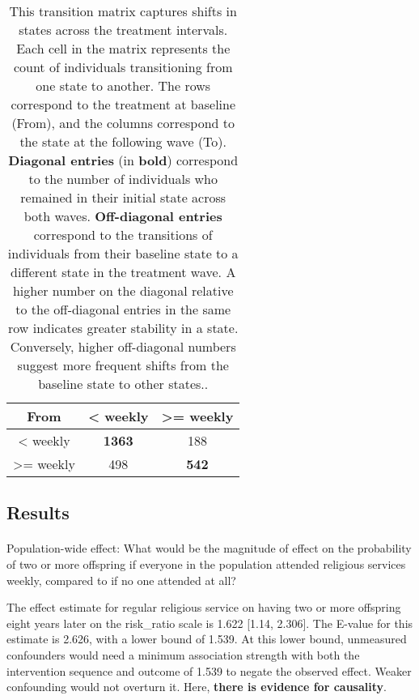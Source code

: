 \documentclass[
  single column]{article}
\makeatletter
\let\oldparagraph\paragraph
\renewcommand{\paragraph}{
    \@ifstar
      \xxxParagraphStar
      \xxxParagraphNoStar
  }
\newcommand{\xxxParagraphStar}[1]{\oldparagraph*{#1}\mbox{}}
\newcommand{\xxxParagraphNoStar}[1]{\oldparagraph{#1}\mbox{}}
\makeatother
\begin{document}
\begin{longtable}[]{@{}ccc@{}}

\caption{\label{tbl-transition}This transition matrix captures shifts in
states across the treatment intervals. Each cell in the matrix
represents the count of individuals transitioning from one state to
another. The rows correspond to the treatment at baseline (From), and
the columns correspond to the state at the following wave (To).
\textbf{Diagonal entries} (in \textbf{bold}) correspond to the number of
individuals who remained in their initial state across both waves.
\textbf{Off-diagonal entries} correspond to the transitions of
individuals from their baseline state to a different state in the
treatment wave. A higher number on the diagonal relative to the
off-diagonal entries in the same row indicates greater stability in a
state. Conversely, higher off-diagonal numbers suggest more frequent
shifts from the baseline state to other states..}

\tabularnewline

\toprule\noalign{}
From & \textless{} weekly & \textgreater= weekly \\
\midrule\noalign{}
\endhead
\bottomrule\noalign{}
\endlastfoot
\textless{} weekly & \textbf{1363} & 188 \\
\textgreater= weekly & 498 & \textbf{542} \\

\end{longtable}

\newpage{}

\subsection{Results}\label{results}

\paragraph{Population-wide effect: What would be the magnitude of effect
on the probability of two or more offspring if everyone in the
population attended religious services weekly, compared to if no one
attended at
all?}\label{population-wide-effect-what-would-be-the-magnitude-of-effect-on-the-probability-of-two-or-more-offspring-if-everyone-in-the-population-attended-religious-services-weekly-compared-to-if-no-one-attended-at-all}

The effect estimate for regular religious service on having two or more
offspring eight years later on the risk\_ratio scale is 1.622 {[}1.14,
2.306{]}. The E-value for this estimate is 2.626, with a lower bound of
1.539. At this lower bound, unmeasured confounders would need a minimum
association strength with both the intervention sequence and outcome of
1.539 to negate the observed effect. Weaker confounding would not
overturn it. Here, \textbf{there is evidence for causality}.
\end{document}
